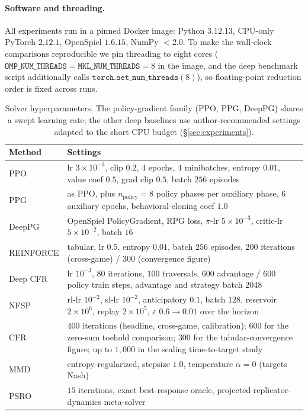\documentclass[11pt,a4paper]{article}
\begin{document}
\paragraph{Software and threading.} All experiments run in a pinned Docker image:
Python $3.12.13$, CPU-only PyTorch $2.12.1$, OpenSpiel $1.6.15$, NumPy $<2.0$. To make
the wall-clock comparisons reproducible we pin threading to eight cores
($\texttt{OMP\_NUM\_THREADS}=\texttt{MKL\_NUM\_THREADS}=8$ in the image, and the deep
benchmark script additionally calls $\texttt{torch.set\_num\_threads}(8)$), so
floating-point reduction order is fixed across runs.

\begin{table}[h]
\centering
\small
\begin{tabular}{ll}
\toprule
Method & Settings \\
\midrule
PPO & lr $3\times10^{-3}$, clip $0.2$, $4$ epochs, $4$ minibatches, entropy $0.01$, value
coef $0.5$, grad clip $0.5$, batch $256$ episodes \\
PPG & as PPO, plus $n_{\text{policy}}{=}8$ policy phases per auxiliary phase, $6$
auxiliary epochs, behavioral-cloning coef $1.0$ \\
DeepPG & OpenSpiel PolicyGradient, RPG loss, $\pi$-lr $5\times10^{-3}$, critic-lr
$5\times10^{-2}$, batch $16$ \\
REINFORCE & tabular, lr $0.5$, entropy $0.01$, batch $256$ episodes, $200$ iterations
(cross-game) / $300$ (convergence figure) \\
Deep CFR & lr $10^{-3}$, $80$ iterations, $100$ traversals, $600$ advantage / $600$
policy train steps, advantage and strategy batch $2048$ \\
NFSP & rl-lr $10^{-2}$, sl-lr $10^{-2}$, anticipatory $0.1$, batch $128$, reservoir
$2\times10^{6}$, replay $2\times10^{5}$, $\varepsilon$ $0.6{\to}0.01$ over the horizon \\
CFR & $400$ iterations (headline, cross-game, calibration); $600$ for the zero-sum
toehold comparison; $300$ for the tabular-convergence figure; up to $1{,}000$ in the
scaling time-to-target study \\
MMD & entropy-regularized, stepsize $1.0$, temperature $\alpha{=}0$ (targets Nash) \\
PSRO & $15$ iterations, exact best-response oracle, projected-replicator-dynamics meta-solver \\
\bottomrule
\end{tabular}
\caption{Solver hyperparameters. The policy-gradient family (PPO, PPG, DeepPG) shares a
swept learning rate; the other deep baselines use author-recommended settings adapted
to the short CPU budget (\S\ref{sec:experiments}).}
\label{tab:hparams}
\end{table}
\end{document}
